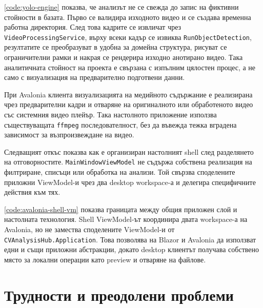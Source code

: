 

\cref{code:yolo-engine} показва, че анализът не се свежда до запис на фиктивни стойности в базата. Първо се валидира изходното видео и се създава временна работна директория. След това кадрите се извличат чрез \texttt{VideoProcessingService}, върху всеки кадър се извиква \texttt{RunObjectDetection}, резултатите се преобразуват в удобна за домейна структура, рисуват се ограничителни рамки и накрая се рендерира изходно анотирано видео. Така аналитичната стойност на проекта е свързана с изпълним цялостен процес, а не само с визуализация на предварително подготвени данни.

При Avalonia клиента визуализацията на медийното съдържание е реализирана чрез предварителни кадри и отваряне на оригиналното или обработеното видео със системния видео плейър. Така настолното приложение използва съществуващата \texttt{ffmpeg} последователност, без да въвежда тежка вградена зависимост за възпроизвеждане на видео.

Следващият откъс показва как е организиран настолният shell след разделянето на отговорностите. \texttt{MainWindowViewModel} не съдържа собствена реализация на филтриране, списъци или обработка на анализи. Той свързва споделените приложни ViewModel-и чрез два desktop workspace-а и делегира специфичните действия към тях.



\cref{code:avalonia-shell-vm} показва границата между общия приложен слой и настолната технология. Shell ViewModel-ът координира двата workspace-а на Avalonia, но не замества споделените ViewModel-и от \texttt{CVAnalysisHub.Application}. Това позволява на Blazor и Avalonia да използват едни и същи приложни абстракции, докато desktop клиентът получава собствено място за локални операции като preview и отваряне на файлове.

\section{Трудности и преодолени проблеми}

